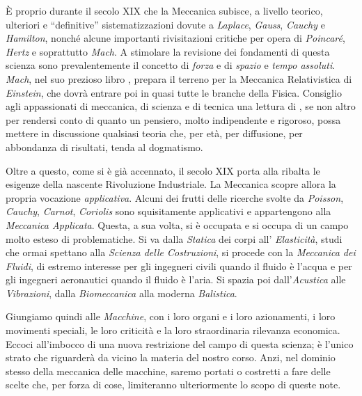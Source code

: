 \noindent \`E proprio durante il secolo XIX che la Meccanica subisce, a livello teorico, ulteriori
e ``definitive'' sistematizzazioni dovute a {\em Laplace}, {\em Gauss}, {\em Cauchy}
e {\em Hamilton}, nonch\'e alcune importanti rivisitazioni critiche per opera di {\em 
Poincar\'e}, {\em Hertz} e soprattutto {\em Mach}. A stimolare la revisione dei
fondamenti
di questa scienza sono prevalentemente il concetto di {\em forza} e di
{\em spazio} e
{\em tempo assoluti}. {\em Mach}, nel suo prezioso libro \cite{mach}, 
prepara il terreno per la Meccanica Relativistica di {\em Einstein}, che dovr\`a 
entrare poi in quasi tutte le branche della Fisica. Consiglio agli
appassionati di meccanica, di scienza e di tecnica una lettura di \cite{mach}, se
non altro
per rendersi conto di quanto un pensiero, molto indipendente e rigoroso, possa mettere
in discussione qualsiasi teoria che, per et\`a, per diffusione, per abbondanza di
risultati, tenda al dogmatismo.

\noindent Oltre a questo, come si \`e gi\`a accennato, il secolo XIX porta alla
ribalta le esigenze della nascente Rivoluzione Industriale. La Meccanica scopre
allora la propria vocazione {\em applicativa}. Alcuni dei frutti delle ricerche svolte da
{\em Poisson}, {\em Cauchy}, {\em Carnot}, {\em Coriolis} sono squisitamente
applicativi e appartengono alla {\em Meccanica Applicata}. 
Questa, a sua volta, si \`e occupata e si occupa di un 
campo molto esteso di problematiche. Si va dalla {\em Statica} dei corpi all'{\em
Elasticit\`a}, studi che ormai spettano alla {\em Scienza delle Costruzioni},
si procede con la {\em Meccanica dei Fluidi}, di estremo interesse
per gli ingegneri civili quando il fluido \`e l'acqua e per gli ingegneri aeronautici quando
il fluido \`e l'aria. Si spazia poi dall'{\em Acustica} alle {\em Vibrazioni}, dalla
{\em Biomeccanica} alla moderna {\em Balistica}.

\noindent Giungiamo  quindi alle {\em Macchine}, con i loro organi e i loro azionamenti, 
i loro movimenti speciali, le loro 
criticit\`a e la loro straordinaria rilevanza economica.
Eccoci all'imbocco di una nuova restrizione del campo di questa
scienza; \`e l'unico strato che riguarder\`a da vicino la materia del
nostro corso. 
Anzi, nel dominio stesso della meccanica delle macchine, saremo portati o costretti
a fare delle scelte che, per forza di cose, limiteranno ulteriormente 
lo scopo di queste note.


